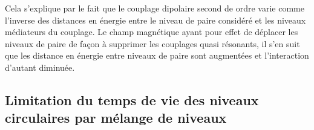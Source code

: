 Cela s'explique par le fait que le couplage dipolaire second de ordre varie comme l'inverse des distances en énergie entre le niveau de paire considéré et les niveaux médiateurs du couplage.
Le champ magnétique ayant pour effet de déplacer les niveaux de paire de façon à supprimer les couplages quasi résonants, il s'en suit que les distance en énergie entre niveaux de paire sont augmentées et l'interaction d'autant diminuée.
%

\subsection{Limitation du temps de vie des niveaux circulaires par mélange de niveaux}

